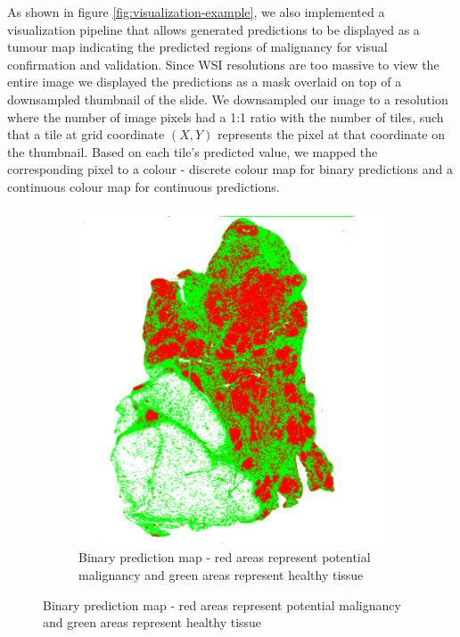 \documentclass{l4proj}
\begin{document}
As shown in figure \ref{fig:visualization-example}, we also implemented a visualization pipeline that allows generated predictions to be displayed as a tumour map indicating the predicted regions of malignancy for visual confirmation and validation. Since WSI resolutions are too massive to view the entire image we displayed the predictions as a mask overlaid on top of a downsampled thumbnail of the slide. We downsampled our image to a resolution where the number of image pixels had a 1:1 ratio with the number of tiles, such that a tile at grid coordinate \((X, Y)\) represents the pixel at that coordinate on the thumbnail. Based on each tile's predicted value, we mapped the corresponding pixel to a colour - discrete colour map for binary predictions and a continuous colour map for continuous predictions. 

\begin{figure}[h]
    \centering
    \begin{subfigure}[b]{0.4\textwidth}
        \includegraphics[scale=0.37]{images/TCGA-BH-A1FE-noback.png}
        \caption{Binary prediction map - red areas represent potential malignancy and green areas represent healthy tissue}
        \label{fig:binary-map}
    \end{subfigure}\hfill%

\end{figure}
\end{document}
